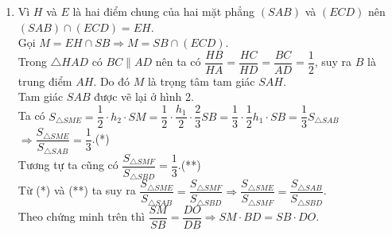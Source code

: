 \begin{ex}
{\begin{enumerate}
			      Trong tam giác $ BDN $ có $ \dfrac{SG}{SN}=\dfrac{DO}{DB}=\dfrac{2}{3} $ nên $ OG\parallel BN $. Mà $ BN\subset (SBC) $ nên $ OG\parallel (SBC) $.
			\item Vì $ H $ và $ E $ là hai điểm chung của hai mặt phẳng $ (SAB) $ và $ (ECD) $ nên $ (SAB)\cap (ECD)=EH $.\\
			      Gọi $ M=EH\cap SB\Rightarrow M=SB\cap (ECD) $.\\
			      Trong $ \triangle HAD $ có $ BC\parallel AD $ nên ta có $ \dfrac{HB}{HA}=\dfrac{HC}{HD}=\dfrac{BC}{AD}=\dfrac{1}{2} $, suy ra $ B $ là trung điểm $ AH $. Do đó $ M $ là trọng tâm tam giác $ SAH $.\\
			      Tam giác $ SAB $ được vẽ lại ở hình 2.\\
			      Ta có $ S_{\triangle SME}=\dfrac{1}{2}\cdot h_{2}\cdot SM=\dfrac{1}{2}\cdot \dfrac{h_{1}}{2}\cdot \dfrac{2}{3}SB=\dfrac{1}{3}\cdot \dfrac{1}{2}h_{1}\cdot SB=\dfrac{1}{3}S_{\triangle SAB}$\\
			      $\Rightarrow \dfrac{S_{\triangle SME}}{S_{\triangle SAB}}=\dfrac{1}{3} $.\hfill(*)\\
			      Tương tự ta cũng có $\dfrac{S_{\triangle SMF}}{S_{\triangle SBD}}=\dfrac{1}{3} $.\hfill(**)\\
			      Từ (*) và (**) ta suy ra $ \dfrac{S_{\triangle SME}}{S_{\triangle SAB}}=\dfrac{S_{\triangle SMF}}{S_{\triangle SBD}}\Rightarrow \dfrac{S_{\triangle SME}}{S_{\triangle SMF}}=\dfrac{S_{\triangle SAB}}{S_{\triangle SBD}} $.\\
			      Theo chứng minh trên thì $ \dfrac{SM}{SB}=\dfrac{DO}{DB}\Rightarrow SM\cdot BD=SB\cdot DO $.
		\end{enumerate}
	}
\end{ex}
